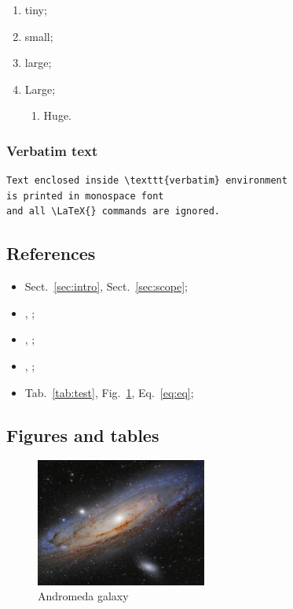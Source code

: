 \begin{enumerate}
\item {\tiny tiny};
\item {\small small};
\item {\large large};
\item {\Large Large};
  \begin{enumerate}
  \item {\Huge Huge}.
  \end{enumerate}
\end{enumerate}


\subsubsection{Verbatim text}

\begin{verbatim}
Text enclosed inside \texttt{verbatim} environment
is printed in monospace font
and all \LaTeX{} commands are ignored.
\end{verbatim}


\subsection{References}

\begin{itemize}
\item Sect.~\ref{sec:intro}, Sect.~\ref{sec:scope};
\item {}, ;
\item {}, ;
\item {}, ;
\item Tab.~\ref{tab:test}, Fig.~\ref{fig:m31}, Eq.~\ref{eq:eq};
\end{itemize}


\subsection{Figures and tables}

\begin{figure}[hbtp!]
  \centering
  \includegraphics[width=0.5\textwidth]{media/m31}
  \caption{Andromeda galaxy}
    \label{fig:m31}
\end{figure}



